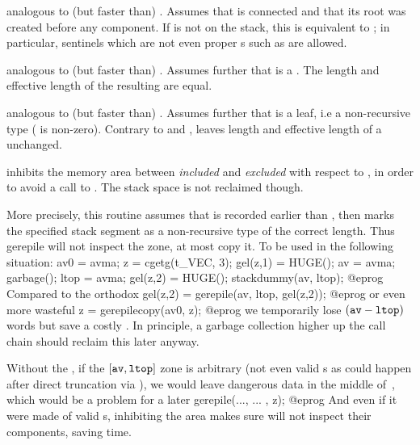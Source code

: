  analogous to (but faster than)
. Assumes that  is connected and that its root was
created before any component. If  is not on the stack, this is
equivalent to ; in particular, sentinels which are not even
proper s such as  are allowed.

 analogous to (but faster than)
. Assumes further that  is a . The
length and effective length of the resulting  are equal.

 analogous to (but faster than)
. Assumes further that  is a leaf, i.e a
non-recursive type ( is non-zero). Contrary to
 and ,  leaves
length and effective length of a  unchanged.


 inhibits the memory area
between  \emph{included} and  \emph{excluded} with respect to
, in order to avoid a call to .
The stack space is not reclaimed though.

More precisely, this routine assumes that  is recorded earlier
than , then marks the specified stack segment as a
non-recursive type of the correct length. Thus gerepile will not inspect
the zone, at most copy it. To be used in the following situation:
\bprog
  av0 = avma; z = cgetg(t_VEC, 3);
  gel(z,1) = HUGE(); av = avma; garbage(); ltop = avma;
  gel(z,2) = HUGE(); stackdummy(av, ltop);
@eprog\noindent
Compared to the orthodox
\bprog
  gel(z,2) = gerepile(av, ltop, gel(z,2));
@eprog\noindent
or even more wasteful
\bprog
  z = gerepilecopy(av0, z);
@eprog\noindent
we temporarily lose $({\tt av} - {\tt ltop})$ words but save a costly
. In principle, a garbage collection higher up the call
chain should reclaim this later anyway.

Without the , if the $[{\tt av}, {\tt ltop}]$ zone is
arbitrary (not even valid s as could happen after direct
truncation via ), we would leave dangerous data in the middle
of~, which would be a problem for a later
\bprog
  gerepile(..., ... , z);
@eprog\noindent
And even if it were made of valid s, inhibiting the area makes sure
 will not inspect their components, saving time.

